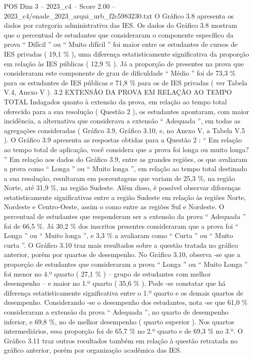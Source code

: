 \begin{textsample}{POS Dim 3 – 2023\_c4 – Score 2.00 – 2023\_c4/enade\_2023\_arqui\_urb\_f2c5983230.txt}
O Gráfico 3.8 apresenta os dados por categoria administrativa das IES.
Os dados do Gráfico 3.8 mostram que o percentual de estudantes que consideraram o componente específico da prova “ Difícil ” ou “ Muito difícil ” foi maior entre os estudantes de cursos de IES privadas ( 19,1 \% ), uma diferença estatisticamente significativa da proporção em relação às IES públicas ( 12,9 \% ).
Já a proporção de presentes na prova que consideraram este componente de grau de dificuldade “ Médio ” foi de 73,3 \% para os estudantes de IES públicas e 71,8 \% para os de IES privadas ( ver Tabela V.4, Anexo V ). 3.2 EXTENSÃO DA PROVA EM RELAÇÃO AO TEMPO TOTAL Indagados quanto à extensão da prova, em relação ao tempo total oferecido para a sua resolução ( Questão 2 ), os estudantes apontaram, com maior incidência, a alternativa que considerava a extensão “ Adequada ”, em todas as agregações consideradas ( Gráfico 3.9, Gráfico 3.10, e, no Anexo V, a Tabela V.5 ).
O Gráfico 3.9 apresenta as respostas obtidas para a Questão 2 : “ Em relação ao tempo total de aplicação, você considera que a prova foi longa ou muito longa? ” Em relação aos dados do Gráfico 3.9, entre as grandes regiões, os que avaliaram a prova como “ Longa ” ou “ Muito longa ”, em relação ao tempo total destinado a sua resolução, resultaram em porcentagens que variam de 25,3 \%, na região Norte, até 31,9 \%, na região Sudeste.
Além disso, é possível observar diferenças estatisticamente significativas entre a região Sudeste em relação às regiões Norte, Nordeste e Centro-Oeste, assim o como entre as regiões Sul e Nordeste.
O percentual de estudantes que responderam ser a extensão da prova “ Adequada ” foi de 66,5 \%.
Já 30,2 \% dos inscritos presentes consideraram que a prova foi “ Longa ” ou “ Muito longa ”, e 3,3 \% a avaliaram como “ Curta ” ou “ Muito curta ”.
O Gráfico 3.10 traz mais resultados sobre a questão tratada no gráfico anterior, porém por quartos de desempenho.
No Gráfico 3.10, observa -se que a proporção de estudantes que consideraram a prova “ Longa ” ou “ Muito Longa ” foi menor no 4.º quarto ( 27,1 \% ) – grupo de estudantes com melhor desempenho – e maior no 1.º quarto ( 35,6 \% ).
Pode -se constatar que há diferença estatisticamente significativa entre o 1.º quarto e os demais quartos de desempenho.
Considerando -se o desempenho dos estudantes, nota -se que 61,0 \% consideraram a extensão da prova “ Adequada ”, no quarto de desempenho inferior, e 69,8 \%, no de melhor desempenho ( quarto superior ).
Nos quartos intermediários, essa proporção foi de 65,7 \% no 2.º quarto e de 69,3 \% no 3.º.
O Gráfico 3.11 traz outros resultados também em relação à questão retratada no gráfico anterior, porém por organização acadêmica das IES.

\end{textsample}
